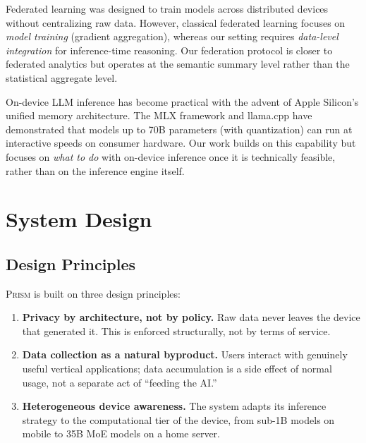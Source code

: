 \documentclass[11pt,a4paper]{article}
\newcommand{\echostream}{\textsc{Prism}}
\begin{document}
Federated learning \citep{mcmahan2017fedavg} was designed to train models
across distributed devices without centralizing raw data. However, classical
federated learning focuses on \emph{model training} (gradient aggregation),
whereas our setting requires \emph{data-level integration} for inference-time
reasoning. Our federation protocol is closer to federated analytics
\citep{ramage2020federated_analytics} but operates at the semantic summary
level rather than the statistical aggregate level.

On-device LLM inference has become practical with the advent of Apple Silicon's
unified memory architecture. The MLX framework \citep{mlx2023} and
llama.cpp \citep{llamacpp2023} have demonstrated that models up to 70B
parameters (with quantization) can run at interactive speeds on consumer
hardware. Our work builds on this capability but focuses on \emph{what to do}
with on-device inference once it is technically feasible, rather than on the
inference engine itself.


\section{System Design}
\label{sec:system}

\subsection{Design Principles}

\echostream{} is built on three design principles:

\begin{enumerate}[leftmargin=*,itemsep=2pt]
  \item \textbf{Privacy by architecture, not by policy.} Raw data never
    leaves the device that generated it. This is enforced structurally, not
    by terms of service.
  \item \textbf{Data collection as a natural byproduct.} Users interact with
    genuinely useful vertical applications; data accumulation is a side effect
    of normal usage, not a separate act of ``feeding the AI.''
  \item \textbf{Heterogeneous device awareness.} The system adapts its
    inference strategy to the computational tier of the device, from sub-1B
    models on mobile to 35B MoE models on a home server.
\end{enumerate}
\end{document}
